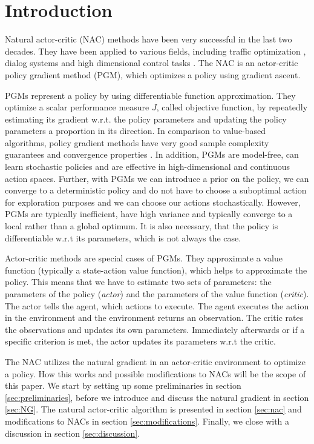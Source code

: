 \section{Introduction}
\label{sec:intro}

Natural actor-critic (NAC) methods \citep{peters2005natural} have been very successful in the last two decades. They have been applied to various fields, including traffic optimization \citep{richter2007natural}, dialog systems \citep{jurvcivcek2011natural} and high dimensional control tasks \citep{park2005rls, peters2008natural, peters2003reinforcement}. The NAC is an actor-critic policy gradient method (PGM), which optimizes a policy using gradient ascent.

PGMs represent a policy by using differentiable function approximation. They optimize a scalar performance measure $J$, called objective function, by repeatedly estimating its gradient w.r.t. the policy parameters and updating the policy parameters a proportion in its direction. In comparison to value-based algorithms, policy gradient methods have very good sample complexity guarantees and convergence properties \cite{nemirovski2005efficient}. In addition, PGMs are model-free, can learn stochastic policies and are effective in high-dimensional and continuous action spaces. Further, with PGMs we can introduce a prior on the policy, we can converge to a deterministic policy and do not have to choose a suboptimal action for exploration purposes and we can choose our actions stochastically. However, PGMs are typically inefficient, have high variance and typically converge to a local rather than a global optimum. It is also necessary, that the policy is differentiable w.r.t its parameters, which is not always the case.

Actor-critic methods are special cases of PGMs. They approximate a value function (typically a state-action value function), which helps to approximate the policy. This means that we have to estimate two sets of parameters: the parameters of the policy (\textit{actor}) and the parameters of the value function (\textit{critic}). The actor tells the agent, which actions to execute. The agent executes the action in the environment and the environment returns an observation. The critic rates the observations and updates its own parameters. Immediately afterwards or if a specific criterion is met, the actor updates its parameters w.r.t the critic.

The NAC utilizes the natural gradient in an actor-critic environment to optimize a policy. How this works and possible modifications to NACs will be the scope of this paper. We start by setting up some preliminaries in section \ref{sec:preliminaries}, before we introduce and discuss the natural gradient in section \ref{sec:NG}. The natural actor-critic algorithm is presented in section \ref{sec:nac} and modifications to NACs in section \ref{sec:modifications}. Finally, we close with a discussion in section \ref{sec:discussion}.


